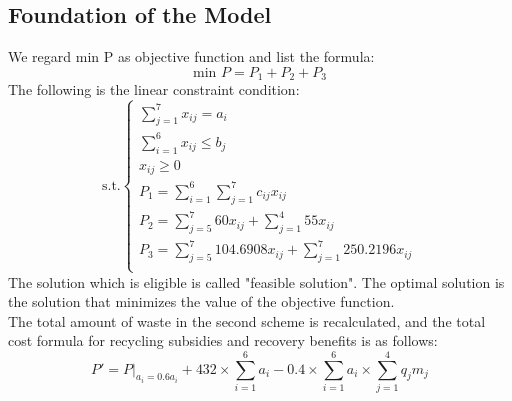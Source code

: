 \documentclass[UTF8]{article}
\begin{document}
\subsection{Foundation of the Model}
\indent We regard min P as objective function and list the formula:\\
\[\textrm{min }P=P_1+P_2+P_3\]
\indent The following is the linear constraint condition:
\[\textrm{s.t.}
\left\{
\begin{array}{lr}
\sum\limits_{j=1}^{7}x_{ij}=a_i\\
\sum\limits_{i=1}^{6}x_{ij}\leq b_j\\
x_{ij}\geq0\\
P_1=\sum\limits_{i=1}^6\sum\limits_{j=1}^7c_{ij}x_{ij}\\
P_2=\sum\limits_{j=5}^{7}60x_{ij}+\sum\limits_{j=1}^{4}55x_{ij}\\
P_3=\sum\limits_{j=5}^{7}104.6908x_{ij}+\sum\limits_{j=1}^{7}250.2196x_{ij}\\
\end{array}
\right.\]
\indent The solution which is eligible is called "feasible solution". The optimal solution is the solution that minimizes the value of the objective function.\\
\indent The total amount of waste in the second scheme is recalculated, and the total cost formula for recycling subsidies and recovery benefits is as follows:
\[P\prime=P|_{a_i=0.6a_i}+432\times\sum\limits_{i=1}^6a_i-0.4\times\sum\limits_{i=1}^6a_i\times\sum\limits_{j=1}^4q_jm_j\]
\end{document}

